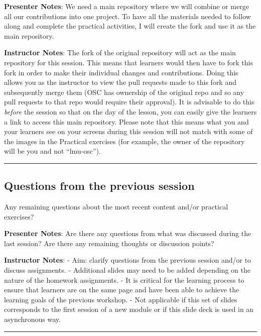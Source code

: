 \documentclass[
  letterpaper,
  DIV=11,
  numbers=noendperiod]{scrartcl}
\begin{document}
\textbf{Presenter Notes}: We need a main repository where we will
combine or merge all our contributions into one project. To have all the
materials needed to follow along and complete the practical activities,
I will create the fork and use it as the main repository.

\textbf{Instructor Notes}: The fork of the original repository will act
as the main repository for this session. This means that learners would
then have to fork this fork in order to make their individual changes
and contributions. Doing this allows you as the instructor to view the
pull requests made to this fork and subsequently merge them (OSC has
ownership of the original repo and so any pull requests to that repo
would require their approval). It is advisable to do this \emph{before}
the session so that on the day of the lesson, you can easily give the
learners a link to access this main repository. Please note that this
means what you and your learners see on your screens during this session
will not match with some of the images in the Practical exercises (for
example, the owner of the repository will be you and not ``lmu-osc'').

\begin{center}\rule{0.5\linewidth}{0.5pt}\end{center}

\subsection{Questions from the previous
session}\label{questions-from-the-previous-session}

Any remaining questions about the most recent content and/or practical
exercises?

\textbf{Presenter Notes}: Are there any questions from what was
discussed during the last session? Are there any remaining thoughts or
discussion points?

\textbf{Instructor Notes}: - Aim: clarify questions from the previous
session and/or to discuss assignments. - Additional slides may need to
be added depending on the nature of the homework assignments. - It is
critical for the learning process to ensure that learners are on the
same page and have been able to achieve the learning goals of the
previous workshop. - Not applicable if this set of slides corresponds to
the first session of a new module or if this slide deck is used in an
asynchronous way.

\begin{center}\rule{0.5\linewidth}{0.5pt}\end{center}
\end{document}
